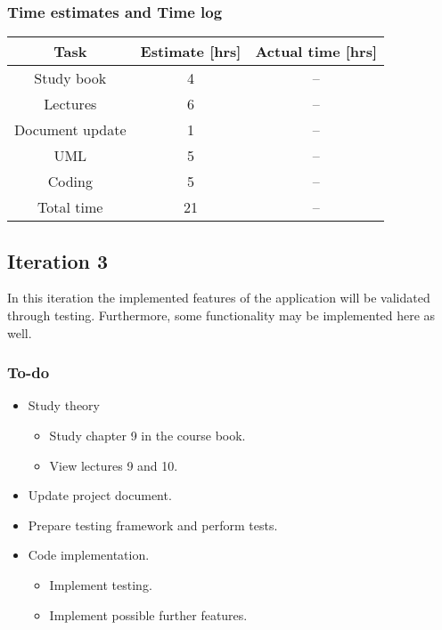 \documentclass[12pt, letterpaper]{article}
\begin{document}
\subsubsection{Time estimates and Time log}
\begin{center}
	\begin{tabular}{|c|c|c|} 
		\hline
		Task & Estimate [hrs] & Actual time [hrs] \\ [0.5ex] 
		\hline\hline
		Study book & 4 & --\\
		\hline
		Lectures & 6 & --\\
		\hline 
		Document update & 1 & --\\
		\hline 
		UML & 5 & -- \\
		\hline
		Coding & 5 & -- \\ 
		\hline
		Total time & 21 & -- \\ [1ex]
		\hline 
	\end{tabular}
\end{center}
\subsection{Iteration 3}
In this iteration the implemented features of the application will be validated through testing. Furthermore, some functionality may be implemented here as well.
\subsubsection{To-do}
\begin{itemize}
	\item Study theory
	\begin{itemize}
		\item Study chapter 9 in the course book.
		\item View lectures 9 and 10.
	\end{itemize}
	\item Update project document.
	\item Prepare testing framework and perform tests.
	\item Code implementation.
	\begin{itemize}
		\item Implement testing.
		\item Implement possible further features.
	\end{itemize}
\end{itemize}
\end{document}
